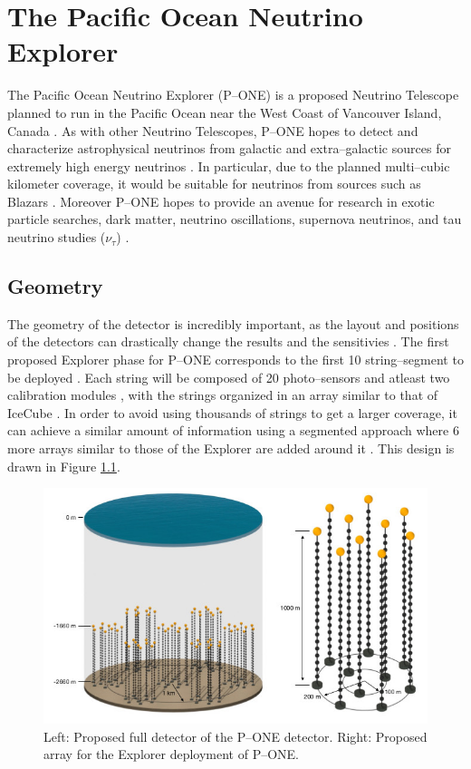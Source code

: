 \chapter{The Pacific Ocean Neutrino Explorer}

The  Pacific Ocean Neutrino Explorer (P--ONE) is a proposed Neutrino Telescope planned to run in the Pacific Ocean near the West Coast of Vancouver Island, Canada \cite{pone}. As with other Neutrino Telescopes, P--ONE hopes to detect and characterize astrophysical neutrinos from galactic and extra--galactic sources for extremely high energy neutrinos \cite{pone}. In particular, due to the planned multi--cubic kilometer coverage, it would be suitable for neutrinos from sources such as Blazars \cite{icecube_nat}. Moreover P--ONE hopes to provide an avenue for research in exotic particle searches, dark matter, neutrino oscillations, supernova neutrinos, and tau neutrino studies ($\nu_{\tau}$) \cite{pone}. 

\section{Geometry}

The geometry of the detector is incredibly important, as the layout and positions of the detectors can drastically change the results and the sensitivies \cite{icecube}. The first proposed Explorer phase for P--ONE corresponds to the first 10 string--segment to be deployed \cite{pone}. Each string will be composed of 20 photo--sensors and atleast two calibration modules \cite{pone}, with the strings organized in an array similar to that of IceCube \cite{pone,icecube}. In order to avoid using thousands of strings to get a larger coverage, it can achieve a similar amount of information using a segmented approach where 6 more arrays similar to those of the Explorer are added around it \cite{pone}. This design is drawn in Figure \ref{fig:pone_geo}. 

\begin{figure}[h]
  \centering
  \includegraphics[width=12cm]{./Figures/PONEv0_-23_design.jpg}
  \caption{Left: Proposed full detector of the P--ONE detector. Right: Proposed array for the Explorer deployment of P--ONE.}
  \label{fig:pone_geo}
\end{figure}

